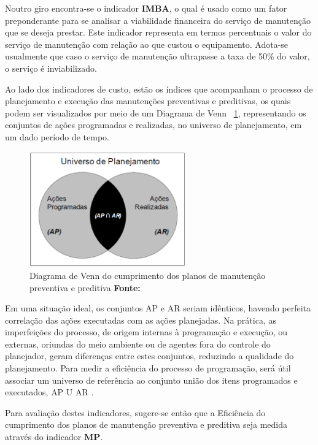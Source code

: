 Noutro giro encontra-se o indicador \textbf{IMBA}, o qual é usado como um fator preponderante para se analisar a viabilidade financeira do serviço de manutenção que se deseja prestar. Este indicador representa em termos percentuais o valor do serviço de manutenção com relação ao que custou o equipamento. Adota-se usualmente que caso o serviço de manutenção ultrapasse a taxa de 50\% do valor, o serviço é inviabilizado.

Ao lado dos indicadores de custo, estão os índices que acompanham o processo de planejamento e execução das manutenções preventivas e preditivas, os quais podem ser visualizados por meio de um Diagrama de Venn ~\ref{Diagrama de Venn da programacao}, representando os conjuntos de ações programadas e realizadas, no universo de planejamento, em um dado período de tempo. 

\graphicspath{{figuras/}}
\begin{figure}[H]
\centering
\includegraphics[width=0.6\textwidth]{Diagrama_de_Venn.eps}
\caption{Diagrama de Venn do cumprimento dos planos de manutenção preventiva e preditiva \textbf{Fonte:\cite{de2006indicadores}}}
\label{Diagrama de Venn da programacao}
\end{figure}

Em uma situação ideal, os conjuntos {AP} e {AR} seriam idênticos, havendo perfeita correlação das ações executadas com as ações planejadas. Na prática, as imperfeições do processo, de origem internas à programação e execução, ou externas, oriundas do meio ambiente ou de agentes fora do controle do planejador, geram diferenças entre estes conjuntos, reduzindo a qualidade do planejamento. Para medir a eficiência do processo de programação, será útil associar um universo de referência ao conjunto união dos itens programados e executados, {AP U AR} \cite{de2006indicadores}.

Para avaliação destes indicadores, sugere-se então que a Eficiência do cumprimento dos planos de manutenção preventiva e preditiva seja medida através do indicador \textbf{MP}.

